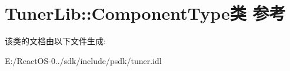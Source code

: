 \hypertarget{class_tuner_lib_1_1_component_type}{}\section{Tuner\+Lib\+:\+:Component\+Type类 参考}
\label{class_tuner_lib_1_1_component_type}


该类的文档由以下文件生成\+:\begin{DoxyCompactItemize}
\item 
E\+:/\+React\+O\+S-\/0../sdk/include/psdk/tuner.\+idl\end{DoxyCompactItemize}
